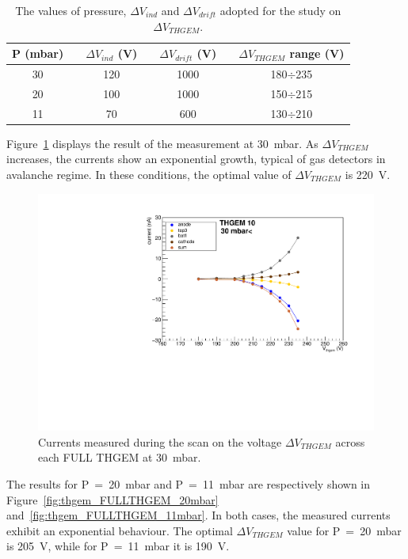 \documentclass[a4paper, 11 pt]{article}
\newcommand{\Vind}{$\Delta V_{ind}$}
\newcommand{\Vthgem}{$\Delta V_{THGEM}$}
\newcommand{\Vdrift}{$ \Delta V_{drift}$}
\begin{document}
\begin{table} [!h]
	\begin{center}
		\renewcommand{\arraystretch}{1.2}
		\begin{tabular} {ccccccc}
			P (mbar) & & \Vind{} (V) & & \Vdrift{} (V) & & \Vthgem{} range (V)\\
			\toprule[0.1em]
			30	& &	120	& &	1000	& & 180$\div$235 \\
			20	& &	100	& & 1000	& & 150$\div$215 \\
			11	& & 70	& & 600		& & 130$\div$210 \\
			
			\bottomrule[0.1em]
		\end{tabular}
	\end{center}
	\caption{The values of pressure, \Vind{} and \Vdrift{} adopted for the study on \Vthgem.} \label{tab:FULLTHGEM_vthgem}
\end{table}

Figure~\ref{fig:thgem_FULLTHGEM_30mbar} displays the result of the measurement at 30~mbar.
As \Vthgem{} increases, the currents show an exponential growth, typical of gas detectors in avalanche regime.
In these conditions, the optimal value of \Vthgem{} is 220~V.
\begin{figure}[!t]
	\centering
	\includegraphics[width=\textwidth]{Immagini/thgemScan_THGEM10_30mbar.pdf}
	\caption{Currents measured during the scan on the voltage \Vthgem{} across each FULL THGEM at 30~mbar.}
	\label{fig:thgem_FULLTHGEM_30mbar}
\end{figure}

The results for P~=~20~mbar and P~=~11~mbar are respectively shown in Figure~\ref{fig:thgem_FULLTHGEM_20mbar} and~\ref{fig:thgem_FULLTHGEM_11mbar}.
In both cases, the measured currents exhibit an exponential behaviour.
The optimal \Vthgem{} value for P~=~20~mbar is 205~V, while for P~=~11~mbar it is 190~V.
\end{document}
